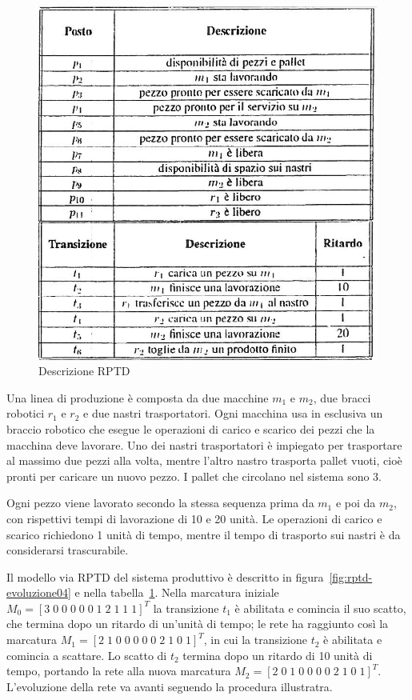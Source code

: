 \documentclass[a4paper]{report}
\begin{document}
\begin{figure}[!h]
  \begin{center}
    \includegraphics[scale=0.4]{./images/rptd-evoluzione05.png}
    \caption{Descrizione RPTD}
    \label{fig:rptd-evoluzione05}
  \end{center}
\end{figure}


Una linea di produzione \`e composta da due macchine $m_1$ e $m_2$,
due bracci robotici $r_1$ e $r_2$ e due nastri trasportatori. Ogni
macchina usa in esclusiva un braccio robotico che esegue le operazioni
di carico e scarico dei pezzi che la macchina deve lavorare. Uno dei
nastri trasportatori \`e impiegato per trasportare al massimo due
pezzi alla volta, mentre l'altro nastro trasporta pallet vuoti, cio\`e
pronti per caricare un nuovo pezzo. I pallet che circolano nel sistema
sono 3.

Ogni pezzo viene lavorato secondo la stessa sequenza prima da $m_1$ e
poi da $m_2$, con rispettivi tempi di lavorazione di 10 e 20
unit\`a. Le operazioni di carico e scarico richiedono 1 unit\`a di
tempo, mentre il tempo di trasporto sui nastri \`e da considerarsi
trascurabile.

Il modello via RPTD del sistema produttivo \`e descritto in
figura~\ref{fig:rptd-evoluzione04} e nella
tabella~\ref{fig:rptd-evoluzione05}. Nella marcatura iniziale $M_0 = [3
\; 0 \; 0 \; 0 \; 0 \; 0\; 1 \; 2\; 1\; 1\; 1]^T$ la transizione $t_1$
\`e abilitata e comincia il suo scatto, che termina dopo un ritardo di
un'unit\`a di tempo; le rete ha raggiunto cos\`i la marcatura $M_1 = [2
  \;1 \;0 \;0 \;0 \;0 \;0 \;2 \;1 \;0 \;1]^T$, in cui la transizione
$t_2$ \`e abilitata e comincia a scattare. Lo scatto di $t_2$ termina
dopo un ritardo di 10 unit\`a di tempo, portando la rete alla nuova
marcatura $M_2 = [2 \;0 \;1 \;0 \;0 \;0 \;0 \;2 \;1 \;0
  \;1]^T$. L'evoluzione della rete va avanti seguendo la procedura
illustratra.
\end{document}
